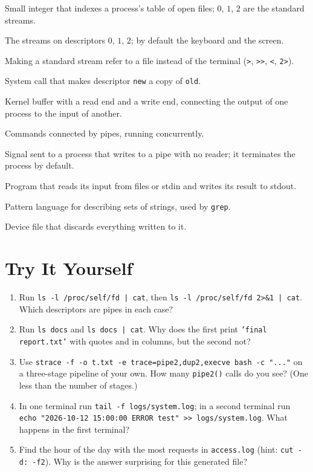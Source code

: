 \documentclass[11pt,a4paper]{article}
\newcommand{\cmd}[1]{\texttt{#1}}
\begin{document}
\begin{description}[leftmargin=0pt,itemsep=0.15em]
  \item[File descriptor] Small integer that indexes a process's table of open files; $0$, $1$, $2$ are the standard streams.
  \item[Standard input / output / error] The streams on descriptors $0$, $1$, $2$; by default the keyboard and the screen.
  \item[Redirection] Making a standard stream refer to a file instead of the terminal (\cmd{>}, \cmd{>>}, \cmd{<}, \cmd{2>}).
  \item[\texttt{dup2(old, new)}] System call that makes descriptor \texttt{new} a copy of \texttt{old}.
  \item[Pipe] Kernel buffer with a read end and a write end, connecting the output of one process to the input of another.
  \item[Pipeline] Commands connected by pipes, running concurrently.
  \item[\texttt{SIGPIPE}] Signal sent to a process that writes to a pipe with no reader; it terminates the process by default.
  \item[Filter] Program that reads its input from files or stdin and writes its result to stdout.
  \item[Regular expression] Pattern language for describing sets of strings, used by \cmd{grep}.
  \item[\texttt{/dev/null}] Device file that discards everything written to it.
\end{description}

\section{Try It Yourself}

\begin{tryit}
\begin{enumerate}[leftmargin=1.4em]
  \item Run \cmd{ls -l /proc/self/fd | cat}, then \cmd{ls -l /proc/self/fd 2>\&1 | cat}. Which descriptors are pipes in each case?
  \item Run \cmd{ls docs} and \cmd{ls docs | cat}. Why does the first print \texttt{'final report.txt'} with quotes and in columns, but the second not?
  \item Use \cmd{strace -f -o t.txt -e trace=pipe2,dup2,execve bash -c "..."} on a three-stage pipeline of your own. How many \cmd{pipe2()} calls do you see? (One less than the number of stages.)
  \item In one terminal run \cmd{tail -f logs/system.log}; in a second terminal run \cmd{echo "2026-10-12 15:00:00 ERROR test" >> logs/system.log}. What happens in the first terminal?
  \item Find the hour of the day with the most requests in \texttt{access.log} (hint: \cmd{cut -d: -f2}). Why is the answer surprising for this generated file?
\end{enumerate}
\end{tryit}
\end{document}
